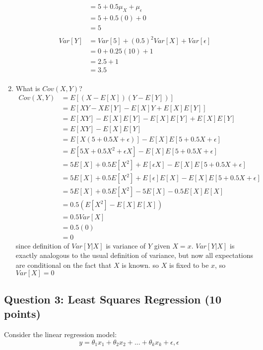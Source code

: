 \documentclass{article}
\begin{document}
\begin{enumerate}
\begin{align*}
&= 5 + 0.5\mu_X + \mu_{\epsilon}\\
&= 5 + 0.5(0) + 0\\
&= 5\\
\\
Var[Y] &= Var[5] + (0.5) ^ 2 Var[X] + Var[\epsilon]\\
&= 0 + 0.25(10) + 1\\
&= 2.5 + 1\\
&= 3.5\\
\end{align*}
\item What is $Cov(X,Y)$?
\begin{align*}
Cov(X, Y) &= E[(X - E[X])(Y - E[Y])]\\
&= E[XY - XE[Y] - E[X]Y + E[X]E[Y]]\\
&= E[XY] - E[X]E[Y] - E[X]E[Y] + E[X]E[Y]\\
&= E[XY] - E[X]E[Y]\\
&= E[X(5 + 0.5X + \epsilon)] - E[X]E[5 + 0.5X + \epsilon]\\
&= E[5X + 0.5X ^ 2 + \epsilon X] - E[X]E[5 + 0.5X + \epsilon]\\
&= 5E[X] + 0.5E[X ^ 2] + E[\epsilon X] - E[X]E[5 + 0.5X + \epsilon]\\
&= 5E[X] + 0.5E[X ^ 2] + E[\epsilon]E[X] - E[X]E[5 + 0.5X + \epsilon]\\
&= 5E[X] + 0.5E[X ^ 2] - 5E[X] - 0.5E[X]E[X]\\
&= 0.5(E[X ^ 2] - E[X]E[X])\\
&= 0.5Var[X]\\
&= 0.5(0)\\
&= 0
\end{align*}
since definition of $Var[Y | X]$ is variance of $Y$ given $X = x$. $Var[Y | X]$ is exactly analogous to the usual definition of variance, but now all expectations are conditional on the fact that $X$ is known. so $X$ is fixed to be $x$, so $Var[X] = 0$
\end{enumerate}

\subsection*{Question 3: Least Squares Regression (10 points)}

Consider the linear regression model: 
\begin{equation}
    y = \theta_{1}x_{1} + \theta_{2}x_{2} + ... + \theta_{k}x_{k} + \epsilon, \epsilon
\end{equation}
\end{document}
